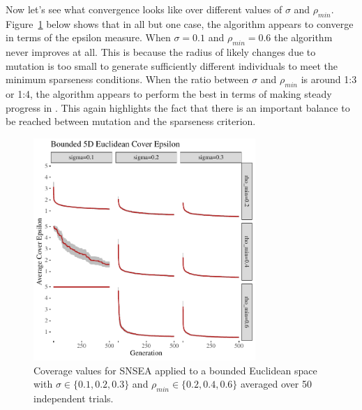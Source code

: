 \documentclass[twoside]{article}
\begin{document}
Now let's see what  convergence looks like over different values of $\sigma$ and $\rho_{min}$.  Figure~\ref{fig:bounded:nopop:sm} below shows that in all but one case, the algorithm appears to converge in terms of the  epsilon measure.  When $\sigma=0.1$ and $\rho_{min} = 0.6$ the algorithm never improves at all.  This is because the radius of likely changes due to mutation is too small to generate sufficiently different individuals to meet the minimum sparseness conditions.  When the ratio between $\sigma$ and $\rho_{min}$ is around 1:3 or 1:4, the algorithm appears to perform the best in terms of making steady progress in .  This again highlights the fact that there is an important balance to be reached between mutation and the sparseness criterion.
%
\begin{figure}[h]
  \center\includegraphics[width=0.75\textwidth]{Figures/bounded-500sm-NOPOP.pdf}
  \caption{\label{fig:bounded:nopop:sm} Coverage values for SNSEA applied to a bounded Euclidean space with $\sigma\in\{0.1,  0.2, 0.3\}$ and $\rho_{min} \in \{0.2, 0.4, 0.6\}$ averaged over 50 independent trials.}
\end{figure}
\end{document}
